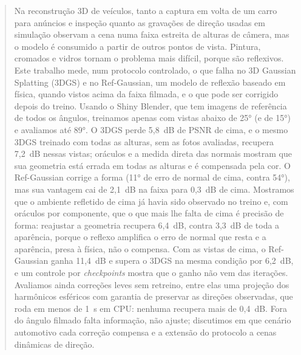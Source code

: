 \begin{abstract}
Na reconstrução 3D de veículos, tanto a captura em volta de um carro para anúncios e inspeção quanto as gravações de direção usadas em simulação observam a cena numa faixa estreita de alturas de câmera, mas o modelo é consumido a partir de outros pontos de vista. Pintura, cromados e vidros tornam o problema mais difícil, porque são reflexivos. Este trabalho mede, num protocolo controlado, o que falha no 3D Gaussian Splatting (3DGS) e no Ref-Gaussian, um modelo de reflexão baseado em física, quando vistos acima da faixa filmada, e o que pode ser corrigido depois do treino. Usando o Shiny Blender, que tem imagens de referência de todos os ângulos, treinamos apenas com vistas abaixo de 25° (e de 15°) e avaliamos até 89°. O 3DGS perde 5,8~dB de PSNR de cima, e o mesmo 3DGS treinado com todas as alturas, sem as fotos avaliadas, recupera 7,2~dB nessas vistas; oráculos e a medida direta das normais mostram que sua geometria está errada em todas as alturas e é compensada pela cor. O Ref-Gaussian corrige a forma (11° de erro de normal de cima, contra 54°), mas sua vantagem cai de 2,1~dB na faixa para 0,3~dB de cima. Mostramos que o ambiente refletido de cima já havia sido observado no treino e, com oráculos por componente, que o que mais lhe falta de cima é precisão de forma: reajustar a geometria recupera 6,4~dB, contra 3,3~dB de toda a aparência, porque o reflexo amplifica o erro de normal que resta e a aparência, presa à física, não o compensa. Com as vistas de cima, o Ref-Gaussian ganha 11,4~dB e supera o 3DGS na mesma condição por 6,2~dB, e um controle por \textit{checkpoints} mostra que o ganho não vem das iterações. Avaliamos ainda correções leves sem retreino, entre elas uma projeção dos harmônicos esféricos com garantia de preservar as direções observadas, que roda em menos de 1~s em CPU: nenhuma recupera mais de 0,4~dB. Fora do ângulo filmado falta informação, não ajuste; discutimos em que cenário automotivo cada correção compensa e a extensão do protocolo a cenas dinâmicas de direção.
\end{abstract}
